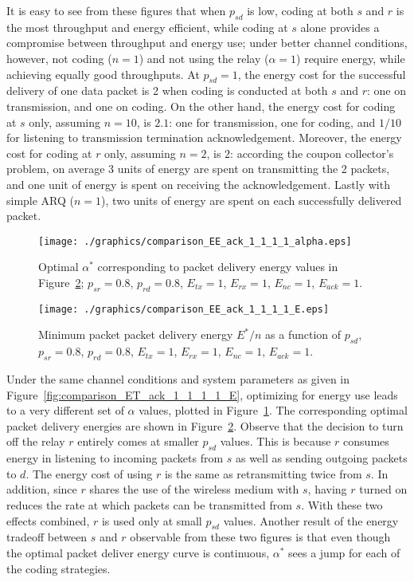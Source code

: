 \documentclass[journal, letterpaper]{IEEEtran}
\begin{document}
It is easy to see from these figures that when $p_{sd}$ is low, coding at both $s$ and $r$ is the most throughput and energy efficient, while coding at $s$ alone provides a compromise between throughput and energy use; under better channel conditions, however, not coding ($n=1$) and not using the relay ($\alpha=1$) require energy, while achieving equally good throughputs. At $p_{sd}=1$, the energy cost for the successful delivery of one data packet is 2 when coding is conducted at both $s$ and $r$: one on transmission, and one on coding. On the other hand, the energy cost for coding at $s$ only, assuming $n=10$, is $2.1$: one for transmission, one for coding, and $1/10$ for listening to transmission termination acknowledgement. Moreover, the energy cost for coding at $r$ only, assuming $n=2$, is $2$: according the coupon collector's problem, on average 3 units of energy are spent on transmitting the 2 packets, and one unit of energy is spent on receiving the acknowledgement. Lastly with simple ARQ ($n=1$), two units of energy are spent on each successfully delivered packet.
\begin{figure}[t!]
\centering
  \texttt{[image: ./graphics/comparison\_EE\_ack\_1\_1\_1\_1\_alpha.eps]}
  \caption{Optimal $\alpha^*$ corresponding to packet delivery energy values in Figure~\ref{fig:comparison_EE_ack_1_1_1_1_E}; $p_{sr}=0.8$, $p_{rd}=0.8$, $E_{tx}=1$, $E_{rx}=1$, $E_{nc}=1$, $E_{ack}=1$.}
  \label{fig:comparison_EE_ack_1_1_1_1_alpha}
\end{figure}
\begin{figure}[t!]
  \centering
    \texttt{[image: ./graphics/comparison\_EE\_ack\_1\_1\_1\_1\_E.eps]}
    \caption{Minimum packet packet delivery energy $E^*/n$ as a function of $p_{sd}$, $p_{sr}=0.8$, $p_{rd}=0.8$, $E_{tx}=1$, $E_{rx}=1$, $E_{nc}=1$, $E_{ack}=1$.}
    \label{fig:comparison_EE_ack_1_1_1_1_E}
\end{figure}
Under the same channel conditions and system parameters as given in Figure~\ref{fig:comparison_ET_ack_1_1_1_1_E}, optimizing for energy use leads to a very different set of $\alpha$ values, plotted in Figure~\ref{fig:comparison_EE_ack_1_1_1_1_alpha}. The corresponding optimal packet delivery energies are shown in Figure~\ref{fig:comparison_EE_ack_1_1_1_1_E}. Observe that the decision to turn off the relay $r$ entirely comes at smaller $p_{sd}$ values. This is because $r$ consumes energy in listening to incoming packets from $s$ as well as sending outgoing packets to $d$. The energy cost of using $r$ is the same as retransmitting twice from $s$. In addition, since $r$ shares the use of the wireless medium with $s$, having $r$ turned on reduces the rate at which packets can be transmitted from $s$. With these two effects combined, $r$ is used only at small $p_{sd}$ values. Another result of the energy tradeoff between $s$ and $r$ observable from these two figures is that even though the optimal packet deliver energy curve is continuous, $\alpha^*$ sees a jump for each of the coding strategies.
\end{document}
